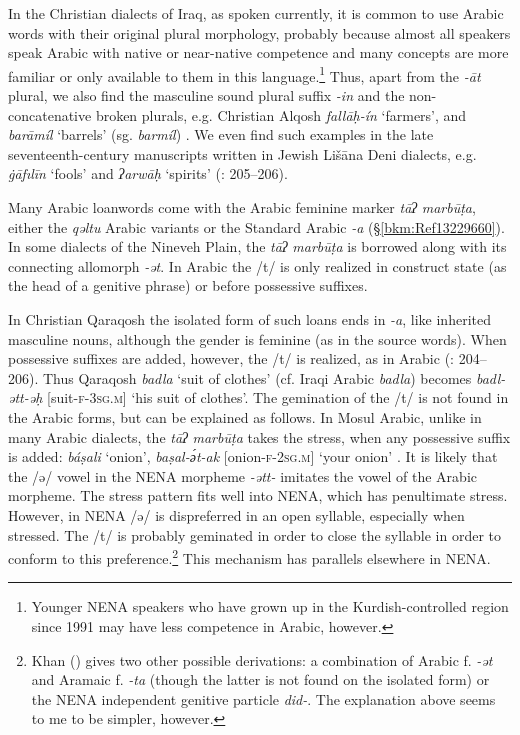 \documentclass[output=paper]{langsci/langscibook}
\begin{document}
In the Christian dialects of Iraq, as spoken currently, it is common to use Arabic words with their original plural morphology, probably because almost all speakers speak Arabic with native or near-native competence and many concepts are more familiar or only available to them in this language.\footnote{Younger NENA speakers who have grown up in the Kurdish-controlled region since 1991 may have less competence in Arabic, however.} Thus, apart from the \textit{\nobreakdash-āt} plural, we also find the masculine sound plural suffix \textit{{}-in} and the non-concatenative broken plurals, e.g. Christian Alqosh \textit{fallāḥ\nobreakdash-ín} ‘farmers’, and \textit{barāmíl} ‘barrels’ (sg. \textit{barmíl}) \citep[273]{Coghill2004}. We even find such examples in the late seventeenth-century manuscripts written in Jewish Lišāna Deni dialects, e.g. \textit{\.gāfılīn} ‘fools’ and \textit{ʔarwāḥ} ‘spirits’ (\citealt{Sabar1984}: 205–206).

Many Arabic loanwords come with the Arabic feminine marker \textit{tāʔ} \textit{marbūṭa}, either the \textit{qəltu} Arabic variants or the Standard Arabic \textit{\nobreakdash-a} (§\ref{bkm:Ref13229660}). In some dialects of the Nineveh Plain, the \textit{tāʔ} \textit{marbūṭa} is borrowed along with its connecting allomorph \textit{{}-ət}. In Arabic the /t/ is only realized in construct state (as the head of a genitive phrase) or before possessive suffixes.

In Christian Qaraqosh the isolated form of such loans ends in \textit{{}-a}, like inherited masculine nouns, although the gender is feminine (as in the source words). When possessive suffixes are added, however, the /t/ is realized, as in Arabic (\citealt{Khan2002}: 204–206). Thus Qaraqosh \textit{badla} ‘suit of clothes’ (cf. Iraqi Arabic \textit{badla}) becomes \textit{badl\nobreakdash-ətt\nobreakdash-əḥ} [suit-\textsc{f-3sg.m]} ‘his suit of clothes’. The gemination of the /t/ is not found in the Arabic forms, but can be explained as follows. In Mosul Arabic, unlike in many Arabic dialects, the \textit{tāʔ} \textit{marbūṭa} takes the stress, when any possessive suffix is added: \textit{báṣali} ‘onion’, \textit{baṣal\nobreakdash-ә́t\nobreakdash-ak} [onion-\textsc{f-2sg.m}] ‘your onion’ \citep[105]{Jastrow1983}. It is likely that the /ə/ vowel in the NENA morpheme \textit{{}-ətt-} imitates the vowel of the Arabic morpheme. The stress pattern fits well into NENA, which has penultimate stress. However, in NENA /ə/ is dispreferred in an open syllable, especially when stressed. The /t/ is probably geminated in order to close the syllable in order to conform to this preference.\footnote{Khan (\citeyear[206]{Khan2002}) gives two other possible derivations: a combination of Arabic f. \textit{\nobreakdash-ət} and Aramaic f. \textit{\nobreakdash-ta} (though the latter is not found on the isolated form) or the NENA independent genitive particle \textit{did-}. The explanation above seems to me to be simpler, however.} This mechanism has parallels elsewhere in NENA.
\end{document}
